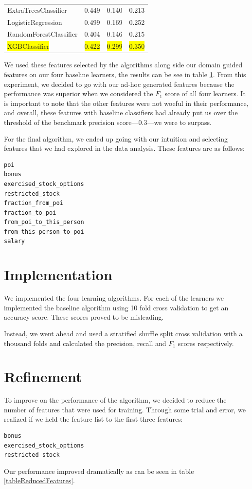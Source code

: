 \documentclass[twoside,openright,titlepage,numbers=noenddot,headinclude,%
               footinclude=true,cleardoublepage=empty,abstractoff,BCOR=5mm,%
               paper=a4,fontsize=11pt,ngerman,american]{scrreprt}
\numberwithin{theorem}{chapter}
\numberwithin{definition}{chapter}
\numberwithin{algorithm}{chapter}
\numberwithin{figure}{chapter}
\numberwithin{table}{chapter}
\numberwithin{equation}{chapter}
\newcommand{\hilight}[1]{\colorbox{yellow}{#1}}
\begin{document}
\begin{table}[!htbp]
\begin{tabular}{|p{6cm}|p{1.5cm}|p{1.5cm}|p{1.5cm}|}
ExtraTreesClassifier     &  0.449       &  0.140     &  0.213     \\ 
LogisticRegression       &  0.499       &  0.169     &  0.252     \\ 
RandomForestClassifier   &  0.404       &  0.146     &  0.215     \\ 
\hilight{XGBClassifier}  &  \hilight{0.422} &  \hilight{0.299} &  \hilight{0.350}     \\ 

\hline %

\end{tabular}
\label{tableBenchMarkScores}
\end{table}

We used these features selected by the algorithms along side our domain guided features on our four baseline learners, the results can be see in table \ref{tableBenchMarkScores}. From this experiment, we decided to go with our ad-hoc generated features because the performance was superior when we considered the $F_1$ score of all four learners. It is important to note that the other features were not woeful in their performance, and overall, these features with baseline classifiers had already put us over the threshold of the benchmark precision score---0.3---we were to surpass.

For the final algorithm, we ended up going with our intuition and selecting features that we had explored in the data analysis. These features are as follows: 
\begin{verbatim}
poi
bonus
exercised_stock_options
restricted_stock
fraction_from_poi
fraction_to_poi
from_poi_to_this_person
from_this_person_to_poi
salary
\end{verbatim}


\section*{Implementation}

We implemented the four learning algorithms. For each of the learners we implemented the baseline algorithm using 10 fold cross validation to get an accuracy score. These scores proved to be misleading. 

Instead, we went ahead and used a stratified shuffle split cross validation with a thousand folds and calculated the precision, recall and $F_1$ scores respectively.


\section*{Refinement}
To improve on the performance of the algorithm, we decided to reduce the number of features that were used for training. Through some trial and error, we realized if we held the feature list to the first three features:
\begin{verbatim}
bonus
exercised_stock_options
restricted_stock 
\end{verbatim}
Our performance improved dramatically as can be seen in table \ref{tableReducedFeatures}.
\end{document}
